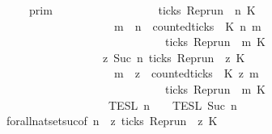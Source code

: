 \begin{isabellebody}
\ {\isacartoucheopen}{\isachardot}{\isachardot}{\isachardot}\ {\isacharequal}\ {\isasymlbrakk}{\isasymlbrakk}\ {\isasymGamma}\ {\isasymrbrakk}{\isasymrbrakk}\isactrlsub p\isactrlsub r\isactrlsub i\isactrlsub m\isanewline
\ \ \ \ \ \ \ \ \ \ \ \ \ \ \ \ {\isasyminter}\ {\isacharbraceleft}{\isasymrho}{\isachardot}\ ticks\ {\isacharparenleft}{\isacharparenleft}Rep{\isacharunderscore}run\ {\isasymrho}{\isacharparenright}\ n\ K\ {\isasymlongrightarrow}\isanewline
\ \ \ \ \ \ \ \ \ \ \ \ \ \ \ \ \ \ \ \ {\isacharparenleft}{\isasymforall}m\ {\isasymge}\ n{\isachardot}\ \ counted{\isacharunderscore}ticks\ {\isasymrho}\ K\ n\ m\ {}\isanewline
\ \ \ \ \ \ \ \ \ \ \ \ \ \ \ \ \ \ \ \ \ \ \ \ \ \ \ \ {\isasymlongrightarrow}\ ticks\ {\isacharparenleft}{\isacharparenleft}Rep{\isacharunderscore}run\ {\isasymrho}{\isacharparenright}\ m\ K\ {\isacharbraceright}\isanewline
\ \ \ \ \ \ \ \ \ \ \ \ \ \ \ \ {\isasyminter}\ {\isacharbraceleft}{\isasymrho}{\isachardot}\ {\isasymforall}z{\isasymge}\ Suc\ n{\isachardot}\ ticks\ {\isacharparenleft}{\isacharparenleft}Rep{\isacharunderscore}run\ {\isasymrho}{\isacharparenright}\ z\ K\ {\isasymlongrightarrow}\isanewline
\ \ \ \ \ \ \ \ \ \ \ \ \ \ \ \ \ \ \ \ {\isacharparenleft}{\isasymforall}m\ {\isasymge}\ z{\isachardot}\ \ counted{\isacharunderscore}ticks\ {\isasymrho}\ K\ z\ m\ {}\isanewline
\ \ \ \ \ \ \ \ \ \ \ \ \ \ \ \ \ \ \ \ \ \ \ \ \ \ \ \ {\isasymlongrightarrow}\ ticks\ {\isacharparenleft}{\isacharparenleft}Rep{\isacharunderscore}run\ {\isasymrho}{\isacharparenright}\ m\ K\ {\isacharbraceright}\isanewline
\ \ \ \ \ \ \ \ \ \ \ \ \ \ \ \ {\isasyminter}\ {\isasymlbrakk}{\isasymlbrakk}\ {\isasymPsi}\ {\isasymrbrakk}{\isasymrbrakk}\isactrlsub T\isactrlsub E\isactrlsub S\isactrlsub L\isactrlbsup {\isasymge}\ n\isactrlesup \ {\isasyminter}\ {\isasymlbrakk}{\isasymlbrakk}\ {\isasymPhi}\ {\isasymrbrakk}{\isasymrbrakk}\isactrlsub T\isactrlsub E\isactrlsub S\isactrlsub L\isactrlbsup {\isasymge}\ Suc\ n\isactrlesup {\isacartoucheclose}\isanewline
\ \ \ \ \isamarkupfalse%
\ forall{\isacharunderscore}nat{\isacharunderscore}set{\isacharunderscore}suc{\isacharbrackleft}of\ {\isacartoucheopen}n{\isacartoucheclose}\ {\isacartoucheopen}{\isasymlambda}{\isasymrho}\ z{\isachardot}\ ticks\ {\isacharparenleft}{\isacharparenleft}Rep{\isacharunderscore}run\ {\isasymrho}{\isacharparenright}\ z\ K\ {\isasymlongrightarrow}\isanewline

\end{isabellebody}
